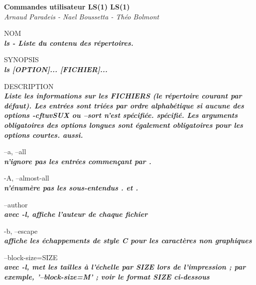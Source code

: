 \documentclass{article}
\begin{document}
\begin{center}
\huge  \textbf{Commandes utilisateur LS(1) LS(1)} \\
\normalsize \textit {Arnaud Paradeis - Nael Boussetta - Théo Bolmont}\\[4cm]
\end{center}










\par NOM\\
		\textit{\textbf{ls - Liste du contenu des répertoires.}}\\
\par SYNOPSIS\\
		\textit{\textbf{ls [OPTION]... [FICHIER]...}}\\
\par DESCRIPTION\\
		\textit{\textbf{Liste les informations sur les FICHIERS (le répertoire courant par défaut).
       Les entrées sont triées par ordre alphabétique si aucune des options -cftuvSUX ou --sort n'est spécifiée.
       spécifié. Les arguments obligatoires des options longues sont également obligatoires pour les options courtes.
       aussi.}}\\

\par --a, --all\\
		\textit{\textbf{n'ignore pas les entrées commençant par .}}\\

\par -A, --almost-all\\
		\textit{\textbf{n'énumère pas les sous-entendus . et .}}\\

\par --author\\
              \textit{\textbf{avec -l, affiche l'auteur de chaque fichier}}\\

   \par-b, --escape\\
              \textit{\textbf{affiche les échappements de style C pour les caractères non graphiques}}\\

       \par--block-size=SIZE\\
             \textit{\textbf{ avec -l, met les tailles à l'échelle par SIZE lors de l'impression ; par exemple,
              '--block-size=M' ; voir le format SIZE ci-dessous}}\\
\end{document}
